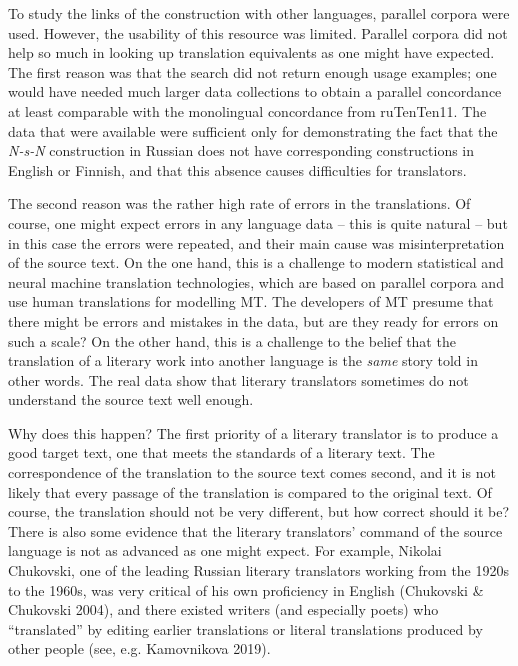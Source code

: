 \documentclass[12pt]{article}
\newenvironment{styleStandard}{\setlength\leftskip{0cm}\setlength\rightskip{0cm plus 1fil}\setlength\parindent{0cm}\setlength\parfillskip{0pt plus 1fil}\setlength\parskip{0in plus 1pt}\writerlistparindent\writerlistleftskip\leavevmode\normalfont\normalsize\writerlistlabel\ignorespaces}{\unskip\vspace{0.111in plus 0.0111in}\par}
\newcommand\writerlistleftskip{}
\newcommand\writerlistparindent{}
\newcommand\writerlistlabel{}
\begin{document}
\begin{styleStandard}
To study the links of the construction with other languages, parallel corpora were used. However, the usability of this resource was limited. Parallel corpora did not help so much in looking up translation equivalents as one might have expected. The first reason was that the search did not return enough usage examples; one would have needed much larger data collections to obtain a parallel concordance at least comparable with the monolingual concordance from ruTenTen11. The data that were available were sufficient only for demonstrating the fact that the \textit{N-s-N} construction in Russian does not have corresponding constructions in English or Finnish, and that this absence causes difficulties for translators.
\end{styleStandard}

\begin{styleStandard}
The second reason was the rather high rate of errors in the translations. Of course, one might expect errors in any language data – this is quite natural – but in this case the errors were repeated, and their main cause was misinterpretation of the source text. On the one hand, this is a challenge to modern statistical and neural machine translation technologies, which are based on parallel corpora and use human translations for modelling MT. The developers of MT presume that there might be errors and mistakes in the data, but are they ready for errors on such a scale? On the other hand, this is a challenge to the belief that the translation of a literary work into another language is the \textit{same} story told in other words. The real data show that literary translators sometimes do not understand the source text well enough.
\end{styleStandard}

\begin{styleStandard}
Why does this happen? The first priority of a literary translator is to produce a good target text, one that meets the standards of a literary text. The correspondence of the translation to the source text comes second, and it is not likely that every passage of the translation is compared to the original text. Of course, the translation should not be very different, but how correct should it be? There is also some evidence that the literary translators’ command of the source language is not as advanced as one might expect. For example, Nikolai Chukovski, one of the leading Russian literary translators working from the 1920s to the 1960s, was very critical of his own proficiency in English (Chukovski \& Chukovski 2004), and there existed writers (and especially poets) who “translated” by editing earlier translations or literal translations produced by other people (see, e.g. Kamovnikova 2019).
\end{styleStandard}
\end{document}
